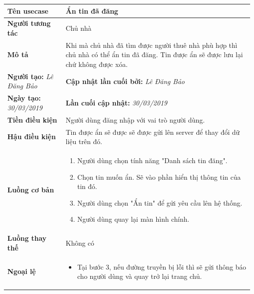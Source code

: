 \begin{center}
	\begin{longtable}{ | l |p{10cm}|}
		\hline
		\textbf{Tên usecase} & Ẩn tin đã đăng \\ \hline
		\textbf{Người tương tác} & Chủ nhà \\ \hline   
		\textbf{Mô tả} &  Khi mà chủ nhà đã tìm được người thuê nhà phù hợp thì chủ nhà có thể ẩn tin đã đăng. Tin được ẩn sẽ được lưu lại chứ không được xóa.\\ \hline  
		\textbf{Người tạo:} \textit{Lê Đăng Bảo} & \textbf{Cập nhật lần cuối bởi:} \textit{Lê Đăng Bảo} \\ \hline
		\textbf{Ngày tạo:} \textit{30/03/2019} & \textbf{Lần cuối cập nhật:} \textit{30/03/2019} \\ \hline
		\textbf{Tiền điều kiện} &  Người dùng đăng nhập với vai trò người dùng. \\ \hline 
		\textbf{Hậu điều kiện} &  Tin được ẩn sẽ được sẽ được gửi lên server để thay đổi dữ liệu trên đó. \\ \hline 
		\textbf{Luồng cơ bản} & 
		\begin{enumerate}
			\item Người dùng chọn tính năng "Danh sách tin đăng".
			\item Chọn tin muốn ẩn. Sẽ vào phần hiển thị thông tin của tin đó.
			\item Người dùng chọn "Ẩn tin" để gửi yêu cầu lên hệ thống.
			\item Người dùng quay lại màn hình chính.
			
		\end{enumerate} \\ \hline 
		\textbf{Luồng thay thế} & Không có \\ \hline
		
		\textbf{Ngoại lệ} &%
		\begin{itemize}
		    \item Tại bước 3, nếu đường truyền bị lỗi thì sẽ gửi thông báo cho người dùng và quay trở lại trang chủ.
		\end{itemize} \\ \hline 
	\end{longtable}
\end{center}